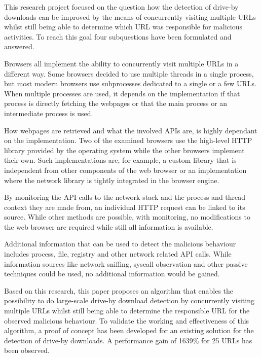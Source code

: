 This research project focused on the question how the detection of drive-by downloads can be improved by the means of concurrently visiting multiple URLs whilst still being able to determine which URL was responsible for malicious activities. To reach this goal four subquestions have been formulated and answered.

Browsers all implement the ability to concurrently visit multiple URLs in a different way. Some browsers decided to use multiple threads in a single process, but most modern browsers use subprocesses dedicated to a single or a few URLs. When multiple processes are used, it depends on the implementation if that process is directly fetching the webpages or that the main process or an intermediate process is used.

How webpages are retrieved and what the involved APIs are, is highly dependant on the implementation. Two of the examined browsers use the high-level HTTP library provided by the operating system while the other browsers implement their own. Such implementations are, for example, a custom library that is independent from other components of the web browser or an implementation where the network library is tightly integrated in the browser engine.

By monitoring the API calls to the network stack and the process and thread context they are made from, an individual HTTP request can be linked to its source. While other methods are possible, with monitoring, no modifications to the web browser are required while still all information is available.

Additional information that can be used to detect the malicious behaviour includes process, file, registry and other network related API calls. While information sources like network sniffing, syscall observation and other passive techniques could be used, no additional information would be gained.

Based on this research, this paper proposes an algorithm that enables the possibility to do large-scale drive-by download detection by concurrently visiting multiple URLs whilst still being able to determine the responsible URL for the observed malicious behaviour. To validate the working and effectiveness of this algorithm, a proof of concept has been developed for an existing solution for the detection of drive-by downloads. A performance gain of 1639\% for 25 URLs has been observed.
